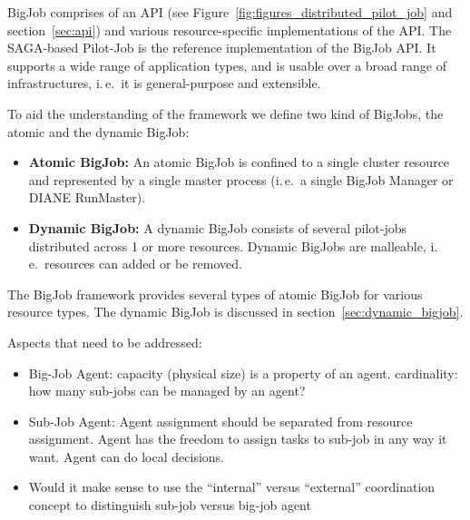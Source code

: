 \documentclass[]{article}
\newcommand{\jhanote}[1]{ {\textcolor{red} { ***shantenu: #1 }}}
\newcommand{\alnote}[1]{ {\textcolor{blue} { ***andre: #1 }}}
\newcommand{\alnote}[1]{}
\newcommand{\jhanote}[1]{}
\begin{document}

BigJob comprises of an API (see Figure~\ref{fig:figures_distributed_pilot_job}
and section~\ref{sec:api}) and various resource-specific implementations of the
API. The SAGA-based Pilot-Job is the reference implementation of the BigJob API.
It supports a wide range of application types, and is usable over a broad range
of infrastructures, i.\,e.\ it is general-purpose and extensible.


To aid the understanding of the framework we define two kind of BigJobs, the atomic and the dynamic BigJob:
\begin{itemize}
   \item  \textbf{Atomic BigJob:} An atomic BigJob is confined to a single 
   cluster resource and represented by a single master process (i.\,e.\ a 
   single BigJob Manager or DIANE RunMaster).
	\item \textbf{Dynamic BigJob:} A dynamic BigJob consists of several 
	pilot-jobs distributed across 1 or more resources. Dynamic BigJobs are 
	malleable, i.\,e.\ resources can added or be removed.
\end{itemize}
The BigJob framework provides several types of atomic BigJob for various 
resource types. The dynamic BigJob is discussed in section~\ref{sec:dynamic_bigjob}.


Aspects that need to be addressed:
\begin{itemize}
    \item Big-Job Agent: capacity (physical size) is a property of an agent. 
	cardinality: how many sub-jobs can be managed by an agent?
	\item Sub-Job Agent: Agent assignment should be separated from resource 
	assignment. Agent has the freedom to assign tasks to sub-job in any way 
	it want. Agent can do local decisions.    
  \item Would it make sense to use the ``internal'' versus
    ``external'' coordination concept to distinguish sub-job
    versus big-job agent
\end{itemize}
\end{document}
